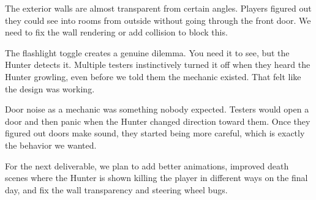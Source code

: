 \documentclass[12pt, a4paper]{article}
\begin{document}
The exterior walls are almost transparent from certain angles. Players figured out they could see into rooms from outside without going through the front door. We need to fix the wall rendering or add collision to block this.

The flashlight toggle creates a genuine dilemma. You need it to see, but the Hunter detects it. Multiple testers instinctively turned it off when they heard the Hunter growling, even before we told them the mechanic existed. That felt like the design was working.

Door noise as a mechanic was something nobody expected. Testers would open a door and then panic when the Hunter changed direction toward them. Once they figured out doors make sound, they started being more careful, which is exactly the behavior we wanted.

For the next deliverable, we plan to add better animations, improved death scenes where the Hunter is shown killing the player in different ways on the final day, and fix the wall transparency and steering wheel bugs.
\end{document}
